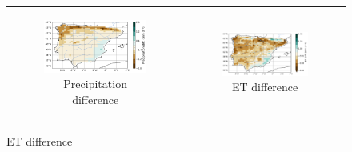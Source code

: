 \begin{figure}[htbp]
\begin{tabular}{cc}
        \begin{subfigure}[b]{0.5\textwidth}
            \caption{Precipitation difference}
            \includegraphics[width=\textwidth]{images/chap4/future/diffmap_precip_presfut.png}
        \end{subfigure} &
        \begin{subfigure}[b]{0.5\textwidth}
            \caption{ET difference}
            \includegraphics[width=\textwidth]{images/chap4/future/diffmap_evap_presfut.png}
        \end{subfigure} \\



\end{tabular}
\end{figure}
